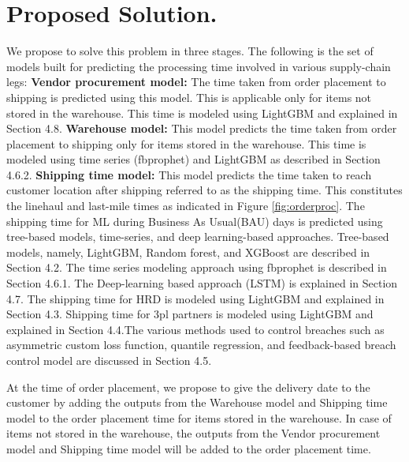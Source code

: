 \documentclass[twoside,leqno,twocolumn]{article}
\begin{document}
\section{Proposed Solution.}

We propose to solve this problem in three stages. The following is the set of models built for predicting the processing time involved in various supply-chain legs:
\vspace{0.1cm} \newline \textbf{Vendor procurement model:} The time taken from order placement to shipping is predicted using this model. This is applicable only for items not stored in the warehouse. This time is modeled using LightGBM\cite{ke2017lightgbm} and explained in Section 4.8.
\newline \textbf{Warehouse model:} This model predicts the time taken from order placement to shipping only for items stored in the warehouse. This time is modeled using time series (fbprophet\cite{taylor2018forecasting}) and LightGBM as described in Section 4.6.2.
\newline \textbf{Shipping time model:} This model predicts the time taken to reach customer location after shipping referred to as the shipping time. This constitutes the linehaul and last-mile times as indicated in Figure \ref{fig:orderproc}. The shipping time for ML during Business As Usual(BAU) days is predicted using tree-based models, time-series, and deep learning-based approaches. Tree-based models, namely, LightGBM, Random forest, and XGBoost are described in Section 4.2. The time series modeling approach using fbprophet is described in Section 4.6.1. The Deep-learning based approach (LSTM) is explained in Section 4.7. The shipping time for HRD is modeled using LightGBM and explained in Section 4.3. Shipping time for 3pl partners is modeled using LightGBM and explained in Section 4.4.\newline The various methods used to control breaches such as asymmetric custom loss function, quantile regression, and feedback-based breach control model are discussed in Section 4.5.

At the time of order placement, we propose to give the delivery date to the customer by adding the outputs from the Warehouse model and Shipping time model to the order placement time for items stored in the warehouse. In case of items not stored in the warehouse, the outputs from the Vendor procurement model and Shipping time model will be added to the order placement time.
\end{document}
